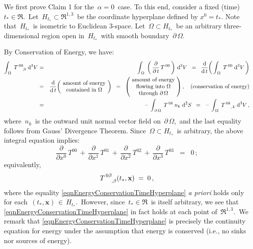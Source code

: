 \vskip 0.2cm
\noindent
We first prove Claim 1 for the \,$\alpha = 0$\, case.
To this end, consider a fixed (time) \,$ t_{*} \in \Re$.\,
Let \,$H_{t_{*}} \subset \Re^{1,3}$\, be the coordinate hyperplane defined by $x^{0} = t_{*}$.
Note that \,$H_{t_{*}}$\, is isometric to Euclidean $3$-space.
Let \,$\Omega \subset H_{t_{*}}$\, be an arbitrary three-dimensional region open in \,$H_{t_{*}}$\, 
with smooth boundary \,$\partial\,\Omega$.\,

\vskip 0.2cm
\noindent
By {\color{red}Conservation of Energy}, we have:
\begin{eqnarray*}
\int_{\,\Omega}\;T^{\,00}_{\,{\color{white}00},0}\;\d^{3}V
& = &
	\int_{\,\Omega}\;\left(\,\dfrac{\partial}{\partial\,t}\,T^{\,00}\,\right)\,\d^{3}V
\;\; = \;\;
	\dfrac{\d}{\d\,t}\!\left(\,\int_{\,\Omega}\;T^{\,00}\;\d^{3}V\,\right)
\\
&=&
\dfrac{\d}{\d\,t}\!\left(\!\begin{array}{c}
	\textnormal{amount of energy}
	\\
	\textnormal{contained in $\Omega$}
	\end{array}\!\right)
\;\; = \;\;
	\left(\!\begin{array}{c}
		\textnormal{amount of energy}
		\\
		\textnormal{flowing into $\Omega$}
		\\
		\textnormal{through $\partial\,\Omega$}
		\end{array}\!\right),
	\quad
	\textnormal{(conservation of energy)}
\\
&=&
	-\,\int_{\,\partial\,\Omega}\;T^{\,0k}\,n_{k}\;\d^{2}S
\;\; = \;\;
	-\,\int_{\,\Omega}\;T^{\,0k}_{\;{\color{white}0k},\,k}\;\d^{3}V\,,
\end{eqnarray*}
where \,$n_{k}$\, is the outward unit normal vector field on \,$\partial\,\Omega$,\,
and the last equality follows from {\color{red}Gauss' Divergence Theorem}.
Since \,$\Omega \subset H_{t_{*}}$\, is arbitrary, the above integral equation implies:
\begin{equation*}
\dfrac{\partial}{\partial x^{0}}\,T^{00}
\,+\,
\dfrac{\partial}{\partial x^{1}}\,T^{01}
\,+\,
\dfrac{\partial}{\partial x^{2}}\,T^{02}
\,+\,
\dfrac{\partial}{\partial x^{3}}\,T^{03}
\;\; = \;\;
0\,;
\end{equation*}
equivalently,
\begin{equation}\label{eqnEnergyConservationTimeHyperplane}
T^{\,0\beta}_{\;{\color{white}0\beta},\beta}(t_{*},\mathbf{x}) \; = \; 0\,,
\end{equation}
where the equality \eqref{eqnEnergyConservationTimeHyperplane}
\textit{a priori} holds only for each \,$(t_{*},\mathbf{x}) \,\in\, H_{t_{*}}$.\,
However, since \,$t_{*} \in \Re$\, is itself arbitrary, we see that 
\eqref{eqnEnergyConservationTimeHyperplane} in fact holds at each point of \,$\Re^{1,3}$.\,
We remark that \eqref{eqnEnergyConservationTimeHyperplane} is precisely
the {\color{red}continuity equation for energy} under the assumption that energy is conserved
(i.e., no sinks nor sources of energy).

